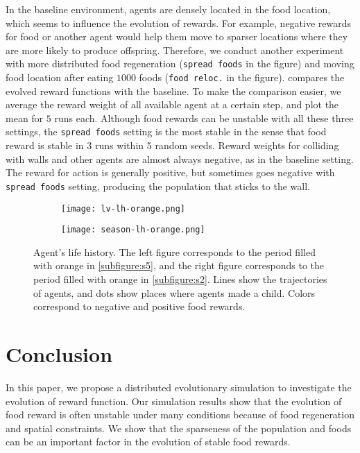 In the baseline environment, agents are densely located in the food location, which seems to influence the evolution of rewards. For example, negative rewards for food or another agent would help them move to sparser locations where they are more likely to produce offspring. Therefore, we conduct another experiment with more distributed food regeneration (\texttt{spread foods} in the figure) and moving food location after eating $1000$ foods (\texttt{food reloc.} in the figure).  compares the evolved reward functions with the baseline. To make the comparison easier, we average the reward weight of all available agent at a certain step, and plot the mean for $5$ runs each. Although food rewards can be unstable with all these three settings, the \texttt{spread foods} setting is the most stable in the sense that food reward is stable in 3 runs within 5 random seeds. Reward weights for colliding with walls and other agents are almost always negative, as in the baseline setting. The reward for action is generally positive, but sometimes goes negative with \texttt{spread foods} setting, producing the population that sticks to the wall.

\begin{figure}[t]
  \begin{subfigure}[t]{7cm}
    \centering
    \texttt{[image: lv-lh-orange.png]}
    \label{subfigure:lvlh}
  \end{subfigure}
  \begin{subfigure}[t]{7cm}
    \centering
    \texttt{[image: season-lh-orange.png]}
    \label{subfigure:seasonlh}
  \end{subfigure}
  \caption{
    Agent's life history. The left figure corresponds to the period filled with orange in \cref{subfigure:s5}, and the right figure corresponds to the period filled with orange in \cref{subfigure:s2}. Lines show the trajectories of agents, and dots show places where agents made a child. Colors correspond to negative and positive food rewards.
  }\label{figure:s5-lh}
\end{figure}

\section{Conclusion}
In this paper, we propose a distributed evolutionary simulation to investigate the evolution of reward function. Our simulation results show that the evolution of food reward is often unstable under many conditions because of food regeneration and spatial constraints. We show that the sparseness of the population and foods can be an important factor in the evolution of stable food rewards.
